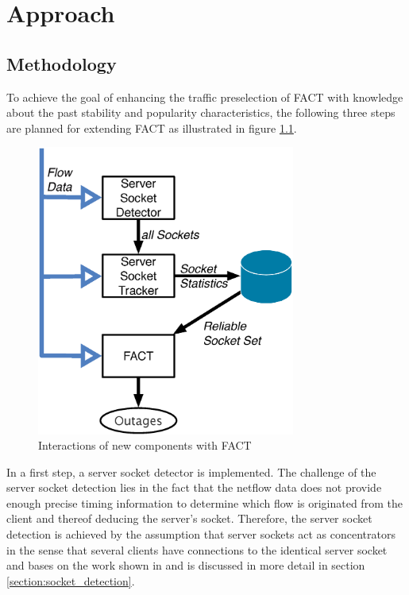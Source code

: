

\chapter{Approach
\label{chapter:approach}}

\section{Methodology
\label{section:methodology}}

To achieve the goal of enhancing the traffic preselection of FACT with
knowledge about the past stability and popularity characteristics, the following
three steps are planned for extending FACT as illustrated in figure 
\ref{fig:FACT}.

\begin{figure}
	[ht] \centering
	\includegraphics[width=8.5cm]{images/Approach_blockdiagram.eps}
	\caption{Interactions of new components with FACT} 
	\label{fig:FACT} 
\end{figure}

In a first step, a server socket detector is implemented. The challenge of the
server socket detection lies in the fact that the netflow data does not provide
enough precise timing information to determine which flow is originated from the
client and thereof deducing the server's socket. Therefore, the server socket
detection is achieved by the assumption that server sockets act as concentrators
in the sense that several clients have connections to the identical server
socket and bases on the work shown in
\cite{Schatzmann:Dissection,Schatzmann:Mining,Schatzmann:Tracing} and is
discussed in more detail in section \ref{section:socket_detection}.

